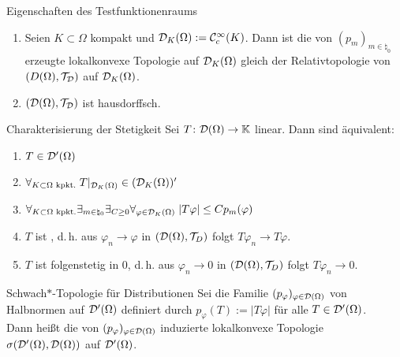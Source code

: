 \linie

\begin{Lemma}{Eigenschaften des Testfunktionenraums}
    \begin{enumerate}
        \item
        Seien $K \subset \Omega$ kompakt und $\mathcal{D}_K(\Omega) := \mathcal{C}^\infty_c(K)$.
        Dann ist die von $(p_m)_{m \in \natural_0}$ erzeugte lokalkonvexe Topologie
        auf $\mathcal{D}_K(\Omega)$ gleich der
        Relativtopologie von $(D(\Omega), \mathcal{T}_{\mathcal{D}})$ auf $\mathcal{D}_K(\Omega)$.
        
        \item
        $(\mathcal{D}(\Omega), \mathcal{T}_{\mathcal{D}})$ ist hausdorffsch.
    \end{enumerate}
\end{Lemma}

\begin{Lemma}{Charakterisierung der Stetigkeit}
    Sei $T\colon \mathcal{D}(\Omega) \rightarrow \mathbb{K}$ linear.
    Dann sind äquivalent:
    \begin{enumerate}
        \item
        $T \in \mathcal{D}'(\Omega)$
        
        \item
        $\forall_{K \subset \Omega \text{ kpkt.}}\; T|_{\mathcal{D}_K(\Omega)} \in (\mathcal{D}_K(\Omega))'$
        
        \item
        $\forall_{K \subset \Omega \text{ kpkt.}} \exists_{m \in \natural_0}
        \exists_{C \ge 0} \forall_{\varphi \in \mathcal{D}_K(\Omega)}\; |T\varphi| \le C p_m(\varphi)$
        
        \item
        $T$ ist , d.\,h.
        aus $\varphi_n \to \varphi$ in $(\mathcal{D}(\Omega), \mathcal{T}_D)$ folgt $T\varphi_n \to T\varphi$.
        
        \item
        $T$ ist folgenstetig in $0$, d.\,h.
        aus $\varphi_n \to 0$ in $(\mathcal{D}(\Omega), \mathcal{T}_D)$ folgt $T\varphi_n \to 0$.
    \end{enumerate}
\end{Lemma}

\linie

\begin{Def}{Schwach$\ast$-Topologie für Distributionen}
    Sei die Familie $(p_\varphi)_{\varphi \in \mathcal{D}(\Omega)}$ von Halbnormen auf $\mathcal{D}'(\Omega)$
    definiert durch $p_\varphi(T) := |T\varphi|$ für alle $T \in \mathcal{D}'(\Omega)$.\\
    Dann heißt die von $(p_\varphi)_{\varphi \in \mathcal{D}(\Omega)}$ induzierte lokalkonvexe Topologie
    \\
    $\sigma(\mathcal{D}'(\Omega), \mathcal{D}(\Omega))$ auf $\mathcal{D}'(\Omega)$.
\end{Def}

